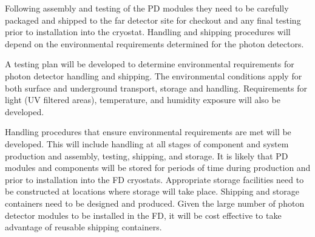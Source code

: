 






Following assembly and testing of the PD modules they need to be carefully packaged and shipped to the far detector site for checkout and any final testing prior to installation into the cryostat. Handling and shipping procedures will depend on the environmental requirements determined for the photon detectors. 

A testing plan will be developed to determine environmental requirements for photon detector handling and shipping. The environmental conditions apply for both surface and underground transport, storage and handling. Requirements for light (UV filtered areas), temperature, and humidity exposure will also be developed.

Handling procedures that ensure environmental requirements are met will be developed. This will include handling at all stages of component and system production and assembly, testing, shipping, and storage. It is likely that PD modules and components will be stored for periods of time during production and prior to installation into the FD cryostats. Appropriate storage facilities need to be constructed at locations where storage will take place. Shipping and storage containers need to be designed and produced. Given the large number of photon detector modules to be installed in the FD, it will be cost effective to take advantage of reusable shipping containers.

